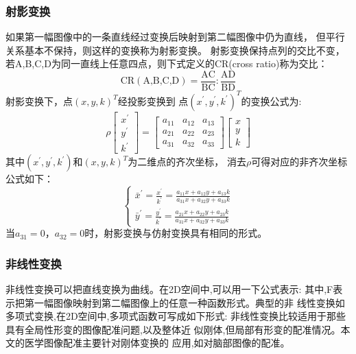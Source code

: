 \subsubsection{射影变换}
如果第一幅图像中的一条直线经过变换后映射到第二幅图像中仍为直线，
但平行关系基本不保持，则这样的变换称为射影变换。
射影变换保持点列的交比不变，
若A,B,C,D为同一直线上任意四点，则下式定义的CR(cross ratio)称为交比：
\begin{equation}
  \text{CR}(\text{A,B,C,D})=
  \frac{\text{AC}}{\text{BC}}:\frac{\text{AD}}{\text{BD}}
\end{equation}
射影变换下，点$(x,y,k)^T$经投影变换到
点$(x^\prime,y^\prime,k^\prime)^T$的变换公式为:
\begin{equation}
  \rho
  \begin{bmatrix}
    x^\prime\\y^\prime\\k^\prime
  \end{bmatrix}=
  \begin{bmatrix}
    a_{11}& a_{12}& a_{13}\\
    a_{21}& a_{22}& a_{23}\\
    a_{31}& a_{32}& a_{33}
  \end{bmatrix}
  \begin{bmatrix}
    x\\y\\k
  \end{bmatrix}
\end{equation}
其中$(x^\prime,y^\prime,k^\prime)$和$(x,y,k)^T$为二维点的齐次坐标，
消去$\rho$可得对应的非齐次坐标公式如下：
\begin{equation}
  \begin{cases}
    \bar{x}^\prime=\frac{x^\prime}{k^\prime}=
    \frac{a_{11}x+a_{12}y+a_{13}k}{a_{31}x+a_{32}y+a_{33}k}\\
    \bar{y}^\prime=\frac{y^\prime}{k^\prime}=
    \frac{a_{21}x+a_{22}y+a_{23}k}{a_{31}x+a_{32}y+a_{33}k}
  \end{cases}
\end{equation}
当$a_{31}=0$，$a_{32}=0$时，射影变换与仿射变换具有相同的形式。
\subsubsection{非线性变换}
非线性变换可以把直线变换为曲线。在2D空间中,可以用一下公式表示:
其中,F表示把第一幅图像映射到第二幅图像上的任意一种函数形式。典型的非
线性变换如多项式变换,在2D空间中,多项式函数可写成如下形式:
非线性变换比较适用于那些具有全局性形变的图像配准问题,以及整体近
似刚体,但局部有形变的配准情况。本文的医学图像配准主要针对刚体变换的
应用,如对脑部图像的配准。

